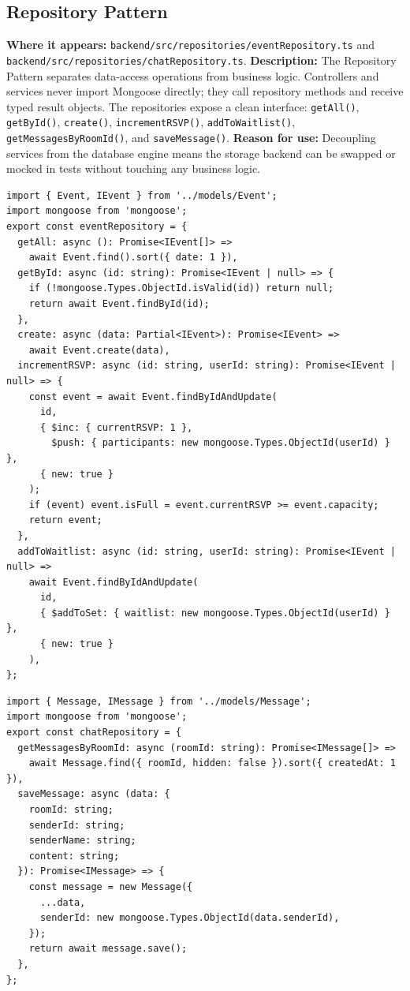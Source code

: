 \documentclass[12pt,a4paper]{article}
\begin{document}
\subsection{Repository Pattern}
\textbf{Where it appears:} \texttt{backend/src/repositories/eventRepository.ts} and \texttt{backend/src/repositories/chatRepository.ts}.
\textbf{Description:} The Repository Pattern separates data-access operations from
business logic. Controllers and services never import Mongoose directly; they call
repository methods and receive typed result objects. The repositories expose a clean
interface: \texttt{getAll()}, \texttt{getById()}, \texttt{create()},
\texttt{incrementRSVP()}, \texttt{addToWaitlist()}, \texttt{getMessagesByRoomId()},
and \texttt{saveMessage()}.
\textbf{Reason for use:} Decoupling services from the database engine means the storage
backend can be swapped or mocked in tests without touching any business logic.
\begin{lstlisting}[caption={eventRepository.ts -- getAll, getById, create, incrementRSVP, addToWaitlist}]
import { Event, IEvent } from '../models/Event';
import mongoose from 'mongoose';
export const eventRepository = {
  getAll: async (): Promise<IEvent[]> =>
    await Event.find().sort({ date: 1 }),
  getById: async (id: string): Promise<IEvent | null> => {
    if (!mongoose.Types.ObjectId.isValid(id)) return null;
    return await Event.findById(id);
  },
  create: async (data: Partial<IEvent>): Promise<IEvent> =>
    await Event.create(data),
  incrementRSVP: async (id: string, userId: string): Promise<IEvent | null> => {
    const event = await Event.findByIdAndUpdate(
      id,
      { $inc: { currentRSVP: 1 },
        $push: { participants: new mongoose.Types.ObjectId(userId) } },
      { new: true }
    );
    if (event) event.isFull = event.currentRSVP >= event.capacity;
    return event;
  },
  addToWaitlist: async (id: string, userId: string): Promise<IEvent | null> =>
    await Event.findByIdAndUpdate(
      id,
      { $addToSet: { waitlist: new mongoose.Types.ObjectId(userId) } },
      { new: true }
    ),
};
\end{lstlisting}
\begin{lstlisting}[caption={chatRepository.ts -- getMessagesByRoomId and saveMessage}]
import { Message, IMessage } from '../models/Message';
import mongoose from 'mongoose';
export const chatRepository = {
  getMessagesByRoomId: async (roomId: string): Promise<IMessage[]> =>
    await Message.find({ roomId, hidden: false }).sort({ createdAt: 1 }),
  saveMessage: async (data: {
    roomId: string;
    senderId: string;
    senderName: string;
    content: string;
  }): Promise<IMessage> => {
    const message = new Message({
      ...data,
      senderId: new mongoose.Types.ObjectId(data.senderId),
    });
    return await message.save();
  },
};
\end{lstlisting}
\end{document}
